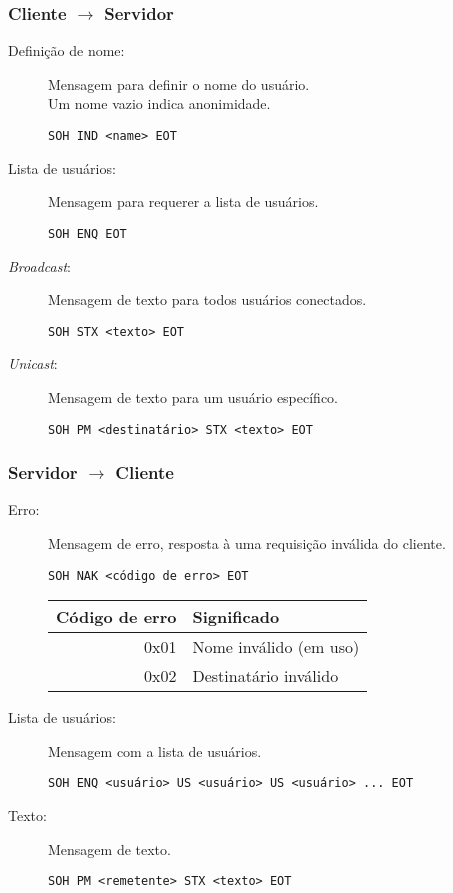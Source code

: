 \documentclass[11pt]{article}
\begin{document}
\subsubsection{Cliente $\rightarrow$ Servidor}
\label{sec:org063775e}
\begin{description}
\item[{Definição de nome:}] Mensagem para definir o nome do usuário. \\
Um nome vazio indica anonimidade.
\begin{verbatim}
SOH IND <name> EOT
\end{verbatim}
\item[{Lista de usuários:}] Mensagem para requerer a lista de usuários.
\begin{verbatim}
SOH ENQ EOT
\end{verbatim}
\item[{\emph{Broadcast}:}] Mensagem de texto para todos usuários conectados.
\begin{verbatim}
SOH STX <texto> EOT
\end{verbatim}
\item[{\emph{Unicast}:}] Mensagem de texto para um usuário específico.
\begin{verbatim}
SOH PM <destinatário> STX <texto> EOT
\end{verbatim}
\end{description}
\subsubsection{Servidor $\rightarrow$ Cliente}
\label{sec:org56e51bb}
\begin{description}
\item[{Erro:}] Mensagem de erro, resposta à uma requisição inválida do cliente.
\begin{verbatim}
SOH NAK <código de erro> EOT
\end{verbatim}

\begin{tabular}{rl}
Código de erro & Significado\\
\hline
0x01 & Nome inválido (em uso)\\
0x02 & Destinatário inválido\\
\end{tabular}
\item[{Lista de usuários:}] Mensagem com a lista de usuários.
\begin{verbatim}
SOH ENQ <usuário> US <usuário> US <usuário> ... EOT
\end{verbatim}
\item[{Texto:}] Mensagem de texto.
\begin{verbatim}
SOH PM <remetente> STX <texto> EOT
\end{verbatim}
\end{description}
\end{document}
